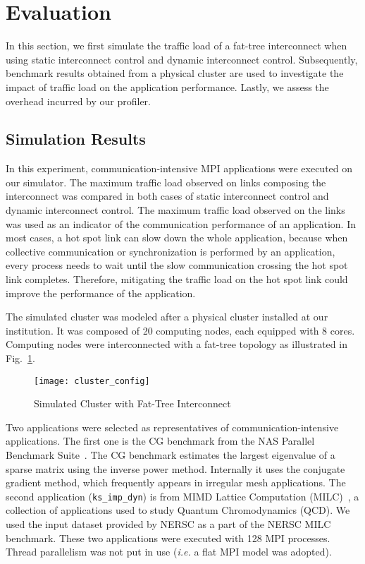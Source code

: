 \section{Evaluation}\label{sec:ii-evaluation}

In this section, we first simulate the traffic load of a fat-tree
interconnect when using static interconnect control and dynamic
interconnect control. Subsequently, benchmark results obtained from a
physical cluster are used to investigate the impact of traffic load on
the application performance. Lastly, we assess the overhead incurred by
our profiler.

\subsection{Simulation Results}\label{sec:ii-simulation-results}

In this experiment, communication-intensive MPI applications were
executed on our simulator. The maximum traffic load observed on links
composing the interconnect was compared in both cases of static
interconnect control and dynamic interconnect control. The maximum
traffic load observed on the links was used as an indicator of the
communication performance of an application. In most cases, a hot spot
link can slow down the whole application, because when collective
communication or synchronization is performed by an application, every
process needs to wait until the slow communication crossing the hot spot
link completes. Therefore, mitigating the traffic load on the hot spot
link could improve the performance of the application.

The simulated cluster was modeled after a physical cluster installed at
our institution. It was composed of 20 computing nodes, each equipped
with 8 cores. Computing nodes were interconnected with a fat-tree
topology as illustrated in Fig.~\ref{fig:cluster-config}.

\begin{figure}
    \centering
    \texttt{[image: cluster\_config]}
    \caption{Simulated Cluster with Fat-Tree Interconnect}%
    \label{fig:cluster-config}
\end{figure}

Two applications were selected as representatives of
communication-intensive applications. The first one is the CG benchmark
from the NAS Parallel Benchmark Suite~\autocite{Bailey1991}. The CG
benchmark estimates the largest eigenvalue of a sparse matrix using the
inverse power method. Internally it uses the conjugate gradient method,
which frequently appears in irregular mesh applications. The second
application (\lstinline!ks_imp_dyn!) is from MIMD
Lattice Computation (MILC)~\autocite{milc}, a collection of applications
used to study Quantum Chromodynamics (QCD). We used the input dataset
provided by NERSC as a part of the NERSC MILC benchmark. These two
applications were executed with 128 MPI processes. Thread parallelism
was not put in use (\emph{i.e.} a flat MPI model was adopted).

